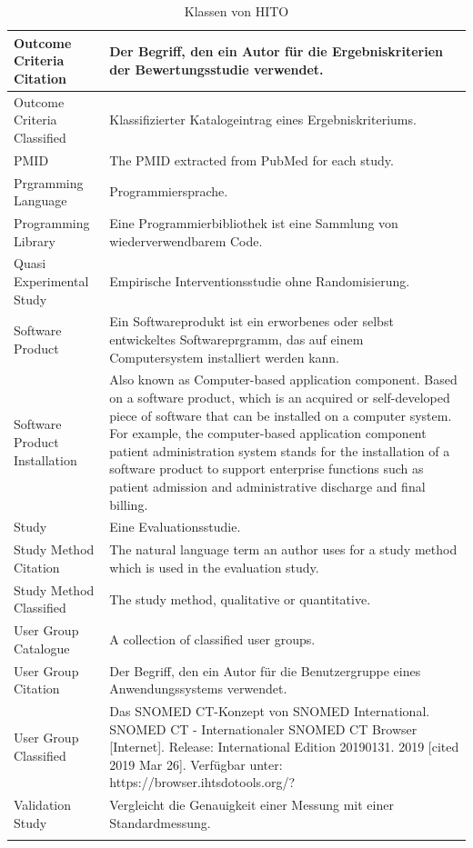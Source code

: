\begin{longtable}{ | p{} | p{7 cm} | }
\hline
Outcome Criteria Citation & Der Begriff, den ein Autor für die Ergebniskriterien der Bewertungsstudie verwendet. \\
\hline
Outcome Criteria Classified & Klassifizierter Katalogeintrag eines Ergebniskriteriums. \\
\hline
PMID & The PMID extracted from PubMed for each study. \\
\hline
Prgramming Language & Programmiersprache. \\ 
\hline
Programming Library & Eine Programmierbibliothek ist eine Sammlung von wiederverwendbarem Code. \\
\hline
Quasi Experimental Study & Empirische Interventionsstudie ohne Randomisierung. \\
\hline
Software Product & Ein Softwareprodukt ist ein erworbenes oder selbst entwickeltes Softwareprgramm, das auf einem Computersystem installiert werden kann. \\
\hline
Software Product Installation & Also known as Computer-based application component. Based on a software product, which is an acquired or self-developed piece of software that can be installed on a computer system. For example, the computer-based application component patient administration system stands for the installation of a software product to support enterprise functions such as patient admission and administrative discharge and final billing. \\
\hline
Study & Eine Evaluationsstudie. \\
\hline
Study Method Citation & The natural language term an author uses for a study method which is used in the evaluation study. \\
\hline
Study Method Classified & The study method, qualitative or quantitative. \\
\hline
User Group Catalogue & A collection of classified user groups. \\
\hline
User Group Citation & Der Begriff, den ein Autor für die Benutzergruppe eines Anwendungssystems verwendet. \\
\hline
User Group Classified & Das SNOMED CT-Konzept von SNOMED International. SNOMED CT - Internationaler SNOMED CT Browser [Internet]. Release: International Edition 20190131. 2019 [cited 2019 Mar 26]. Verfügbar unter: https://browser.ihtsdotools.org/? \\
\hline
Validation Study & Vergleicht die Genauigkeit einer Messung mit einer Standardmessung.\\
\hline
\caption{Klassen von HITO}
\label{table:hito_klassen}
\end{longtable}


